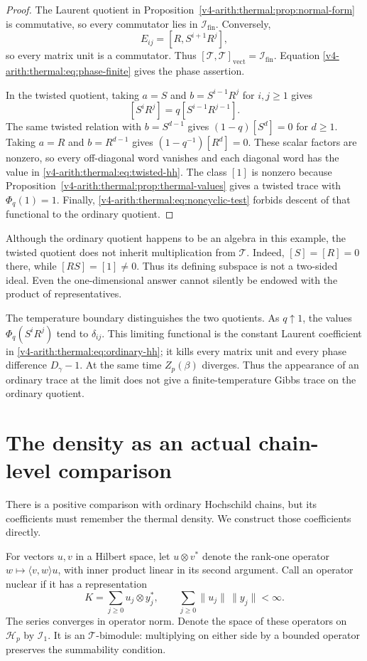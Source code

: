 \begin{proof}
The Laurent quotient in Proposition~\ref{v4-arith:thermal:prop:normal-form} is
commutative, so every commutator lies in $\mathcal I_{\mathrm{fin}}$.
Conversely,
\[
 E_{ij}=[R,S^{i+1}R^j],
\]
so every matrix unit is a commutator. Thus
$[\mathcal T,\mathcal T]_{\mathrm{vect}}=\mathcal I_{\mathrm{fin}}$.
Equation \eqref{v4-arith:thermal:eq:phase-finite} gives the phase assertion.

In the twisted quotient, taking $a=S$ and
$b=S^{i-1}R^j$ for $i,j\geq1$ gives
\[
 [S^iR^j]=q[S^{i-1}R^{j-1}].
\]
The same twisted relation with $b=S^{d-1}$ gives
$(1-q)[S^d]=0$ for $d\geq1$. Taking $a=R$ and $b=R^{d-1}$ gives
$(1-q^{-1})[R^d]=0$. These scalar factors are nonzero, so every
off-diagonal word vanishes and each diagonal word has the value
in \eqref{v4-arith:thermal:eq:twisted-hh}. The class $[1]$ is nonzero because
Proposition~\ref{v4-arith:thermal:prop:thermal-values} gives a twisted trace with
$\Phi_q(1)=1$. Finally, \eqref{v4-arith:thermal:eq:noncyclic-test} forbids descent
of that functional to the ordinary quotient.
\end{proof}

Although the ordinary quotient happens to be an algebra in this
example, the twisted quotient does not inherit multiplication from
$\mathcal T$. Indeed, $[S]=[R]=0$ there, while $[RS]=[1]\ne0$.
Thus its defining subspace is not a two-sided ideal. Even the
one-dimensional answer cannot silently be endowed with the product
of representatives.

The temperature boundary distinguishes the two quotients. As
$q\uparrow1$, the values $\Phi_q(S^iR^j)$ tend to $\delta_{ij}$.
This limiting functional is the constant Laurent coefficient in
\eqref{v4-arith:thermal:eq:ordinary-hh}; it kills every matrix unit and every phase
difference $D_\gamma-1$. At the same time $Z_p(\beta)$ diverges.
Thus the appearance of an ordinary trace at the limit does not
give a finite-temperature Gibbs trace on the ordinary quotient.

\section{The density as an actual chain-level comparison}

There is a positive comparison with ordinary Hochschild chains, but
its coefficients must remember the thermal density. We construct
those coefficients directly.

For vectors $u,v$ in a Hilbert space, let $u\otimes v^*$ denote
the rank-one operator $w\mapsto\langle v,w\rangle u$, with inner
product linear in its second argument. Call an operator nuclear if
it has a representation
\[
 K=\sum_{j\geq0}u_j\otimes y_j^*,\qquad
 \sum_{j\geq0}\|u_j\|\,\|y_j\|<\infty.
\]
The series converges in operator norm. Denote the space of these
operators on $\mathscr H_p$ by $\mathcal I_1$. It is an
$\mathcal T$-bimodule: multiplying on either side by a bounded
operator preserves the summability condition.

